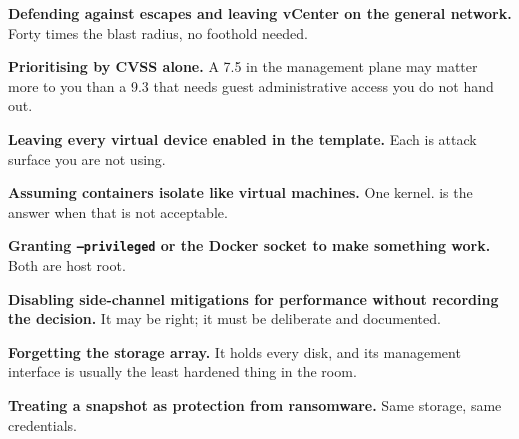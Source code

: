 \begin{pitfall}
\begin{tight}
  \item \textbf{Defending against escapes and leaving vCenter on the general
        network.} Forty times the blast radius, no foothold needed.
  \item \textbf{Prioritising by CVSS alone.} A 7.5 in the management plane may
        matter more to you than a 9.3 that needs guest administrative access
        you do not hand out.
  \item \textbf{Leaving every virtual device enabled in the template.} Each is
        attack surface you are not using.
  \item \textbf{Assuming containers isolate like virtual machines.} One kernel.
         is the answer when that is not acceptable.
  \item \textbf{Granting \texttt{--privileged} or the Docker socket to make
        something work.} Both are host root.
  \item \textbf{Disabling side-channel mitigations for performance without
        recording the decision.} It may be right; it must be deliberate and
        documented.
  \item \textbf{Forgetting the storage array.} It holds every disk, and its
        management interface is usually the least hardened thing in the room.
  \item \textbf{Treating a snapshot as protection from ransomware.} Same
        storage, same credentials.
\end{tight}
\end{pitfall}

